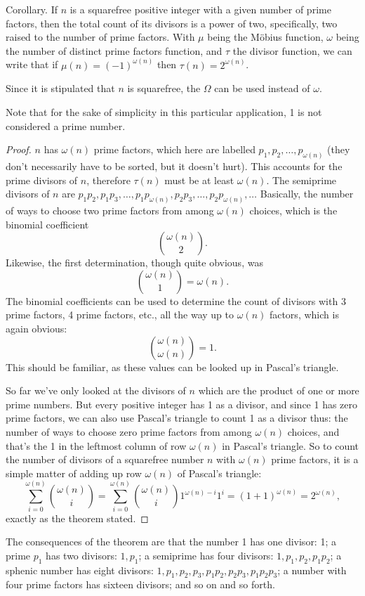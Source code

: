 \documentclass[12pt]{article}
\begin{document}
Corollary. If $n$ is a squarefree positive integer with a given number of prime factors, then the total count of its divisors is a power of two, specifically, two raised to the number of prime factors. With $\mu$ being the M\"obius function, $\omega$ being the number of distinct prime factors function, and $\tau$ the divisor function, we can write that if $\mu(n) = (-1)^{\omega(n)}$ then $\tau(n) = 2^{\omega(n)}$.

Since it is stipulated that $n$ is squarefree, the  $\Omega$ can be used instead of $\omega$.

Note that for the sake of simplicity in this particular application, 1 is not considered a prime number.

\begin{proof}
$n$ has $\omega(n)$ prime factors, which here are labelled $p_1, p_2, \ldots , p_{\omega(n)}$ (they don't necessarily have to be sorted, but it doesn't hurt). This accounts for the prime divisors of $n$, therefore $\tau(n)$ must be at least $\omega(n)$. The semiprime divisors of $n$ are $p_1 p_2, p_1 p_3, \ldots , p_1 p_{\omega(n)}, p_2 p_3, \ldots , p_2 p_{\omega(n)}, \ldots$ Basically, the number of ways to choose two prime factors from among $\omega(n)$ choices, which is the binomial coefficient $$\binom{\omega(n)}{2}.$$ Likewise, the first determination, though quite obvious, was $$\binom{\omega(n)}{1} = \omega(n).$$ The binomial coefficients can be used to determine the count of divisors with 3 prime factors, 4 prime factors, etc., all the way up to $\omega(n)$ factors, which is again obvious: $$\binom{\omega(n)}{\omega(n)} = 1.$$ This should be familiar, as these values can be looked up in Pascal's triangle.

So far we've only looked at the divisors of $n$ which are the product of one or more prime numbers. But every positive integer has 1 as a divisor, and since 1 has zero prime factors, we can also use Pascal's triangle to count 1 as a divisor thus: the number of ways to choose zero prime factors from among $\omega(n)$ choices, and that's the 1 in the leftmost column of row $\omega(n)$ in Pascal's triangle. So to count the number of divisors of a squarefree number $n$ with $\omega(n)$ prime factors, it is a simple matter of adding up row $\omega(n)$ of Pascal's triangle: $$\sum_{i = 0}^{\omega(n)} \binom{\omega(n)}{i} = \sum_{i = 0}^{\omega(n)} \binom{\omega(n)}{i} 1^{\omega(n) - i}1^i = (1 + 1)^{\omega(n)} = 2^{\omega(n)},$$ exactly as the theorem stated.
\end{proof}

The consequences of the theorem are that the number 1 has one divisor: 1; a prime $p_1$ has two divisors: $1, p_1$; a semiprime has four divisors: $1, p_1, p_2, p_1 p_2$; a sphenic number has eight divisors: $1, p_1, p_2, p_3, p_1 p_2, p_2 p_3, p_1 p_2 p_3$; a number with four prime factors has sixteen divisors; and so on and so forth.
\end{document}
